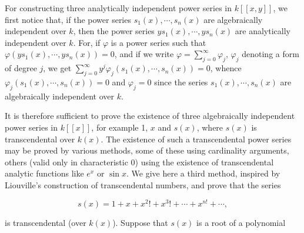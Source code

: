 For constructing three analytically independent power series in $k[[x, y]]$, we first notice that, if the power series $s_1(x), \cdots, s_n(x)$ are algebraically independent over $k$, then the power series $ys_1(x), \cdots, ys_n(x)$ are analytically independent over $k$. For, if $\varphi$ is a power series such that $\varphi(ys_1(x), \cdots, ys_n(x)) = 0$, and if we write $\varphi = \sum_{j=0}^{\infty} \varphi_j$, $\varphi_j$ denoting a form of degree $j$, we get $\sum_{j=0}^{\infty} y^j \varphi_j(s_1(x), \cdots, s_n(x)) = 0$, whence $\varphi_j(s_1(x), \cdots, s_n(x)) = 0$ and $\varphi_j = 0$ since the series $s_1(x), \cdots, s_n(x)$ are algebraically independent over $k$.

It is therefore sufficient to prove the existence of three algebraically independent power series in $k[[x]]$, for example 1, $x$ and $s(x)$, where $s(x)$ is transcendental over $k(x)$. The existence of such a transcendental power series may be proved by various methods, some of these using cardinality arguments, others (valid only in characteristic 0) using the existence of transcendental analytic functions like $e^x$ or $\sin x$. We give here a third method, inspired by Liouville's construction of transcendental numbers, and prove that the series

$$s(x) = 1 + x + x^2! + x^3! + \cdots + x^{n!} + \cdots,$$

is transcendental (over $k(x)$). Suppose that $s(x)$ is a root of a polynomial